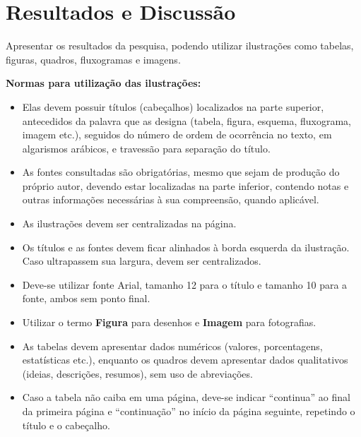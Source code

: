 \section{Resultados e Discussão}

Apresentar os resultados da pesquisa, podendo utilizar ilustrações como tabelas, figuras, quadros, fluxogramas e imagens.

\textbf{Normas para utilização das ilustrações:}

\begin{itemize}

\item Elas devem possuir títulos (cabeçalhos) localizados na parte superior, antecedidos da palavra que as designa (tabela, figura, esquema, fluxograma, imagem etc.), seguidos do número de ordem de ocorrência no texto, em algarismos arábicos, e travessão para separação do título.

\item As fontes consultadas são obrigatórias, mesmo que sejam de produção do próprio autor, devendo estar localizadas na parte inferior, contendo notas e outras informações necessárias à sua compreensão, quando aplicável.

\item As ilustrações devem ser centralizadas na página.

\item Os títulos e as fontes devem ficar alinhados à borda esquerda da ilustração. Caso ultrapassem sua largura, devem ser centralizados.

\item Deve-se utilizar fonte Arial, tamanho 12 para o título e tamanho 10 para a fonte, ambos sem ponto final.

\item Utilizar o termo \textbf{Figura} para desenhos e \textbf{Imagem} para fotografias.

\item As tabelas devem apresentar dados numéricos (valores, porcentagens, estatísticas etc.), enquanto os quadros devem apresentar dados qualitativos (ideias, descrições, resumos), sem uso de abreviações.

\item Caso a tabela não caiba em uma página, deve-se indicar ``continua'' ao final da primeira página e ``continuação'' no início da página seguinte, repetindo o título e o cabeçalho.

\end{itemize}

